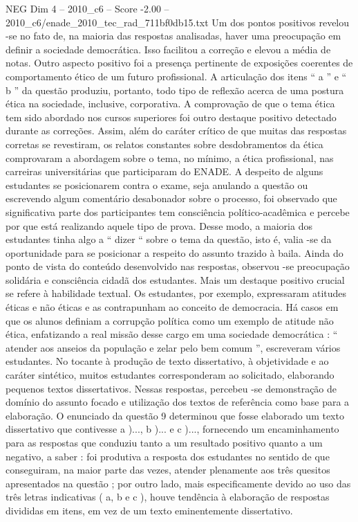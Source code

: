 \begin{textsample}{NEG Dim 4 – 2010\_c6 – Score -2.00 – 2010\_c6/enade\_2010\_tec\_rad\_711bf0db15.txt}
Um dos pontos positivos revelou -se no fato de, na maioria das respostas analisadas, haver uma preocupação em definir a sociedade democrática.
Isso facilitou a correção e elevou a média de notas.
Outro aspecto positivo foi a presença pertinente de exposições coerentes de comportamento ético de um futuro profissional.
A articulação dos itens “ a ” e “ b ” da questão produziu, portanto, todo tipo de reflexão acerca de uma postura ética na sociedade, inclusive, corporativa.
A comprovação de que o tema ética tem sido abordado nos cursos superiores foi outro destaque positivo detectado durante as correções.
Assim, além do caráter crítico de que muitas das respostas corretas se revestiram, os relatos constantes sobre desdobramentos da ética comprovaram a abordagem sobre o tema, no mínimo, a ética profissional, nas carreiras universitárias que participaram do ENADE.
A despeito de alguns estudantes se posicionarem contra o exame, seja anulando a questão ou escrevendo algum comentário desabonador sobre o processo, foi observado que significativa parte dos participantes tem consciência político-acadêmica e percebe por que está realizando aquele tipo de prova.
Desse modo, a maioria dos estudantes tinha algo a “ dizer “ sobre o tema da questão, isto é, valia -se da oportunidade para se posicionar a respeito do assunto trazido à baila.
Ainda do ponto de vista do conteúdo desenvolvido nas respostas, observou -se preocupação solidária e consciência cidadã dos estudantes.
Mais um destaque positivo crucial se refere à habilidade textual.
Os estudantes, por exemplo, expressaram atitudes éticas e não éticas e as contrapunham ao conceito de democracia.
Há casos em que os alunos definiam a corrupção política como um exemplo de atitude não ética, enfatizando a real missão desse cargo em uma sociedade democrática : “ atender aos anseios da população e zelar pelo bem comum ”, escreveram vários estudantes.
No tocante à produção de texto dissertativo, à objetividade e ao caráter sintético, muitos estudantes corresponderam ao solicitado, elaborando pequenos textos dissertativos.
Nessas respostas, percebeu -se demonstração de domínio do assunto focado e utilização dos textos de referência como base para a elaboração.
O enunciado da questão 9 determinou que fosse elaborado um texto dissertativo que contivesse a )..., b )... e c )..., fornecendo um encaminhamento para as respostas que conduziu tanto a um resultado positivo quanto a um negativo, a saber : foi produtiva a resposta dos estudantes no sentido de que conseguiram, na maior parte das vezes, atender plenamente aos três quesitos apresentados na questão ; por outro lado, mais especificamente devido ao uso das três letras indicativas ( a, b e c ), houve tendência à elaboração de respostas divididas em itens, em vez de um texto eminentemente dissertativo.

\end{textsample}

